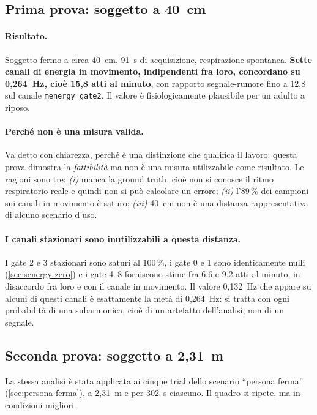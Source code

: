 \subsection{Prima prova: soggetto a 40~cm}

\paragraph{Risultato.} Soggetto fermo a circa 40~cm, 91~s di acquisizione,
respirazione spontanea. \textbf{Sette canali di energia in movimento, indipendenti
fra loro, concordano su 0,264~Hz, cioè 15,8 atti al minuto}, con rapporto
segnale-rumore fino a 12,8 sul canale \texttt{menergy\_gate2}. Il valore è
fisiologicamente plausibile per un adulto a riposo.

\paragraph{Perché non è una misura valida.} Va detto con chiarezza, perché è una
distinzione che qualifica il lavoro: questa prova dimostra la \emph{fattibilità} ma
non è una misura utilizzabile come risultato. Le ragioni sono tre:
\emph{(i)} manca la ground truth, cioè non si conosce il ritmo respiratorio reale e
quindi non si può calcolare un errore; \emph{(ii)} l'89\,\% dei campioni sui canali
in movimento è saturo; \emph{(iii)} 40~cm non è una distanza rappresentativa di
alcuno scenario d'uso.

\paragraph{I canali stazionari sono inutilizzabili a questa distanza.} I gate 2 e 3
stazionari sono saturi al 100\,\%, i gate 0 e 1 sono identicamente nulli
(\cref{sec:senergy-zero}) e i gate 4--8 forniscono stime fra 6,6 e 9,2 atti al
minuto, in disaccordo fra loro e con il canale in movimento. Il valore 0,132~Hz che
appare su alcuni di questi canali è esattamente la metà di 0,264~Hz: si tratta con
ogni probabilità di una subarmonica, cioè di un artefatto dell'analisi, non di un
segnale.

\subsection{Seconda prova: soggetto a 2,31~m}

La stessa analisi è stata applicata ai cinque trial dello scenario ``persona ferma''
(\cref{sec:persona-ferma}), a 2,31~m e per 302~s ciascuno. Il quadro si ripete, ma
in condizioni migliori.

